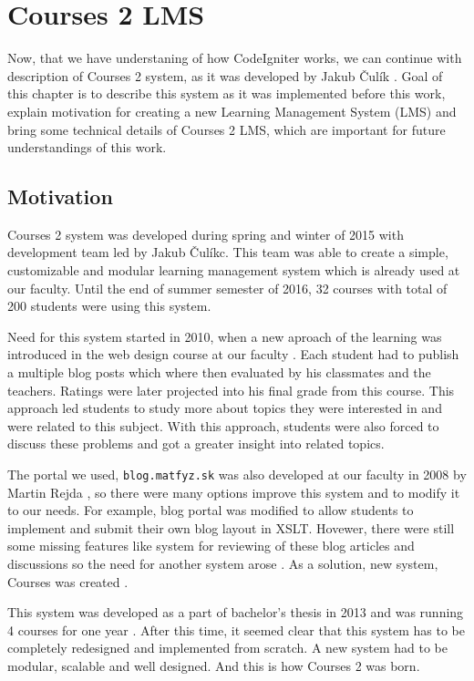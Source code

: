 \chapter{Courses 2 LMS}
\label{sec:courses}

Now, that we have understaning of how CodeIgniter works, we can continue with description of Courses 2 system, as it was developed by Jakub \v{C}ul\'{i}k \cite{culik}. Goal of this chapter is to describe this system as it was implemented before this work, explain motivation for creating a new Learning Management System (LMS) and bring some technical details of Courses 2 LMS, which are important for future understandings of this work.

\section{Motivation}

Courses 2 system was developed during spring and winter of 2015 with development team led by Jakub \v{C}ul\'{i}kc. This team was able to create a simple, customizable and modular learning management system which is already used at our faculty. Until the end of summer semester of 2016, 32 courses with total of 200 students were using this system.


Need for this system started in 2010, when a new aproach of the learning was introduced in the web design course at our faculty \cite{culik}. Each student had to publish a multiple blog posts which where then evaluated by his classmates and  the teachers. Ratings were later projected into his final grade from this course. This approach led students to study more about topics they were interested in and were related to this subject. With this approach, students were also forced to discuss these problems and got a greater insight into related topics.

The portal we used, \texttt{blog.matfyz.sk} was also developed at our faculty in 2008 by Martin Rejda \cite{rejda}, so there were many options improve this system and to modify it to our needs. For example, blog portal was modified to allow students to implement and submit their own blog layout in XSLT. Hovewer, there were still some missing features like system for reviewing of these blog articles and discussions so the need for another system arose \cite{culik}. As a solution, new system, Courses was created \cite{culikbc}.


This system was developed as a part of bachelor's thesis in 2013 \cite{culikbc} and was running 4 courses for one year \cite{culik}. After this time, it seemed clear that this system has to be completely redesigned and implemented from scratch. A new system had to be modular, scalable and well designed. And this is how Courses 2 was born.

